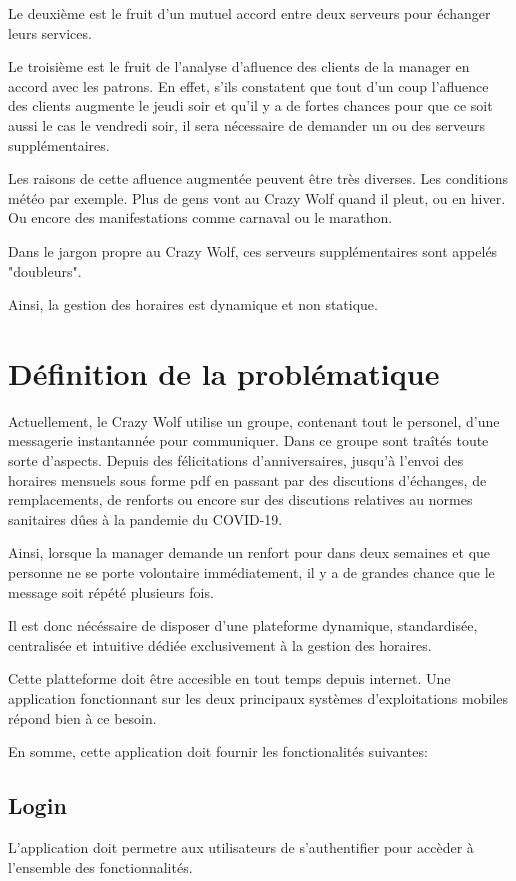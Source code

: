 Le deuxième est le fruit d'un mutuel accord entre deux serveurs pour échanger leurs services.

Le troisième est le fruit de l'analyse d'afluence des clients de la manager en accord avec les patrons. En effet, s'ils constatent que tout d'un coup l'afluence des clients augmente le jeudi soir et qu'il y a de fortes chances pour que ce soit aussi le cas le vendredi soir, il sera nécessaire de demander un ou des serveurs supplémentaires. 

Les raisons de cette afluence augmentée peuvent être très diverses. Les conditions météo par exemple. Plus de gens vont au Crazy Wolf quand il pleut, ou en hiver. Ou encore des manifestations comme carnaval ou le marathon.

Dans le jargon propre au Crazy Wolf, ces serveurs supplémentaires sont appelés "doubleurs".

Ainsi, la gestion des horaires est dynamique et non statique.

\section[Problématique]{Définition de la problématique}
Actuellement, le Crazy Wolf utilise un groupe, contenant tout le personel, d'une messagerie instantannée pour communiquer. Dans ce groupe sont traîtés toute sorte d'aspects. Depuis des félicitations d'anniversaires, jusqu'à l'envoi des horaires mensuels sous forme pdf en passant par des discutions d'échanges, de remplacements, de renforts ou encore sur des discutions relatives au normes sanitaires dûes à la pandemie du COVID-19. 

Ainsi, lorsque la manager demande un renfort pour dans deux semaines et que personne ne se porte volontaire immédiatement, il y a de grandes chance que le message soit répété plusieurs fois.

Il est donc nécéssaire de disposer d'une plateforme dynamique, standardisée, centralisée et intuitive dédiée exclusivement à la gestion des horaires. 

Cette platteforme doit être accesible en tout temps depuis internet. Une application fonctionnant sur les deux principaux systèmes d'exploitations mobiles répond bien à ce besoin.

En somme, cette application doit fournir les fonctionalités suivantes:

\subsection*{Login}
L'application doit permetre aux utilisateurs de s'authentifier pour accèder à l'ensemble des fonctionnalités.

